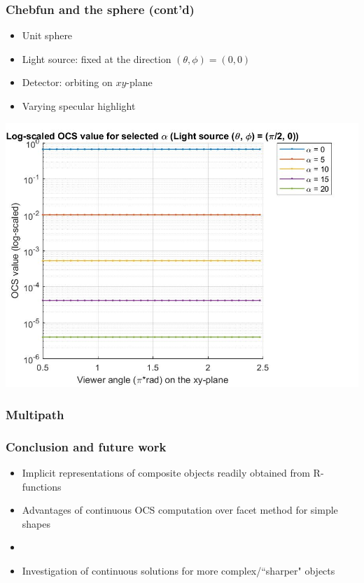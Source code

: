 \documentclass{beamer}
\begin{document}
\begin{frame}[t]
\frametitle{Chebfun and the sphere (cont'd)}
\begin{itemize}
\item Unit sphere
\item Light source: fixed at the direction $(\theta,\phi) = (0,0)$
\item Detector: orbiting on $xy$-plane
\item Varying specular highlight
\end{itemize}

\centering \includegraphics[scale=0.13]{./figs/OCS_perpendicular_plane}
\end{frame}


\begin{frame}[t]
\frametitle{Multipath}
\end{frame}


\begin{frame}[t]
\frametitle{Conclusion and future work}
\begin{itemize}
\item Implicit representations of composite objects readily obtained from R-functions 
\item Advantages of continuous OCS computation over facet method for simple shapes
\item 
\item Investigation of continuous solutions for more complex/``sharper" objects 
\end{itemize}
\end{frame}
\end{document}
